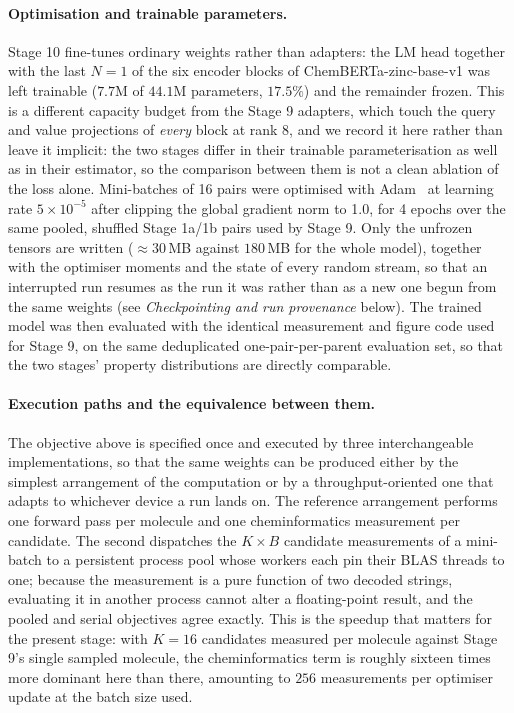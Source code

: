 \paragraph{Optimisation and trainable parameters.}
Stage 10 fine-tunes ordinary weights rather than adapters: the LM head together
with the last $N=1$ of the six encoder blocks of ChemBERTa-zinc-base-v1 was
left trainable ($7.7$M of $44.1$M parameters, $17.5\%$) and the remainder
frozen. This is a different capacity budget from the Stage 9 adapters, which
touch the query and value projections of \emph{every} block at rank 8, and we
record it here rather than leave it implicit: the two stages differ in their
trainable parameterisation as well as in their estimator, so the comparison
between them is not a clean ablation of the loss alone. Mini-batches of 16
pairs were optimised with Adam~\cite{kingma2015adam} at learning rate
$5\times10^{-5}$ after clipping the global gradient norm to 1.0, for 4 epochs
over the same pooled, shuffled Stage 1a/1b pairs used by Stage 9. Only the
unfrozen tensors are written ($\approx\!30$\,MB against $180$\,MB for the whole
model), together with the optimiser moments and the state of every random
stream, so that an interrupted run resumes as the run it was rather than as a
new one begun from the same weights (see \emph{Checkpointing and run
provenance} below). The trained model was then evaluated with the identical
measurement and figure code used for Stage 9, on the same deduplicated
one-pair-per-parent evaluation set, so that the two stages' property
distributions are directly comparable.

\paragraph{Execution paths and the equivalence between them.}
The objective above is specified once and executed by three interchangeable
implementations, so that the same weights can be produced either by the
simplest arrangement of the computation or by a throughput-oriented one that
adapts to whichever device a run lands on. The reference arrangement performs
one forward pass per molecule and one cheminformatics measurement per
candidate. The second dispatches the $K\!\times\!B$ candidate measurements of a
mini-batch to a persistent process pool whose workers each pin their BLAS
threads to one; because the measurement is a pure function of two decoded
strings, evaluating it in another process cannot alter a floating-point result,
and the pooled and serial objectives agree exactly. This is the speedup that
matters for the present stage: with $K=16$ candidates measured per molecule
against Stage 9's single sampled molecule, the cheminformatics term is roughly
sixteen times more dominant here than there, amounting to $256$ measurements
per optimiser update at the batch size used.

